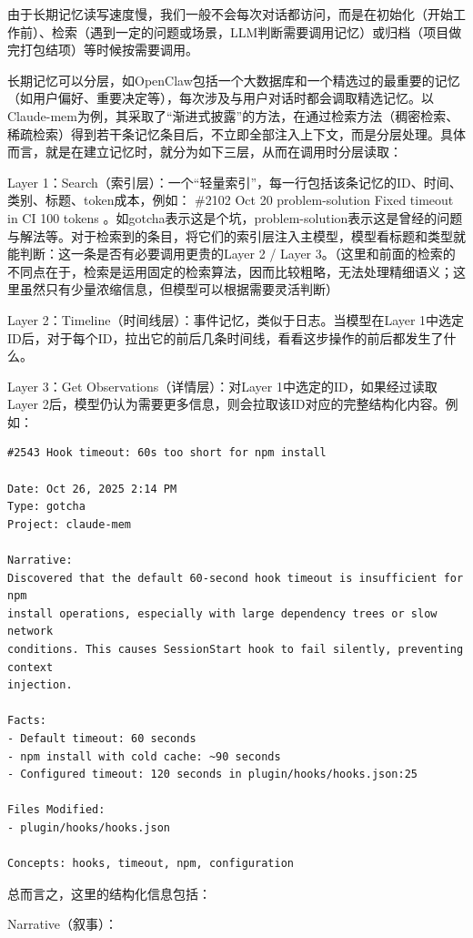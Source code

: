 由于长期记忆读写速度慢，我们一般不会每次对话都访问，而是在初始化（开始工作前）、检索（遇到一定的问题或场景，LLM判断需要调用记忆）或归档（项目做完打包结项）等时候按需要调用。

长期记忆可以分层，如OpenClaw包括一个大数据库和一个精选过的最重要的记忆（如用户偏好、重要决定等），每次涉及与用户对话时都会调取精选记忆。以Claude-mem为例，其采取了``渐进式披露''的方法，在通过检索方法（稠密检索、稀疏检索）得到若干条记忆条目后，不立即全部注入上下文，而是分层处理。具体而言，就是在建立记忆时，就分为如下三层，从而在调用时分层读取：

Layer 1：Search（索引层）：一个``轻量索引''，每一行包括该条记忆的ID、时间、类别、标题、token成本，例如：\textbar{} \#2102\textbar{} Oct 20 \textbar{} problem-solution \textbar{} Fixed timeout in CI \textbar{} 100 tokens \textbar。如gotcha表示这是个坑，problem-solution表示这是曾经的问题与解法等。对于检索到的条目，将它们的索引层注入主模型，模型看标题和类型就能判断：这一条是否有必要调用更贵的Layer 2 / Layer 3。（这里和前面的检索的不同点在于，检索是运用固定的检索算法，因而比较粗略，无法处理精细语义；这里虽然只有少量浓缩信息，但模型可以根据需要灵活判断）

Layer 2：Timeline（时间线层）：事件记忆，类似于日志。当模型在Layer 1中选定ID后，对于每个ID，拉出它的前后几条时间线，看看这步操作的前后都发生了什么。

Layer 3：Get Observations（详情层）：对Layer 1中选定的ID，如果经过读取Layer 2后，模型仍认为需要更多信息，则会拉取该ID对应的完整结构化内容。例如：

\begin{verbatim}
#2543 Hook timeout: 60s too short for npm install

Date: Oct 26, 2025 2:14 PM
Type: gotcha
Project: claude-mem

Narrative:
Discovered that the default 60-second hook timeout is insufficient for npm
install operations, especially with large dependency trees or slow network
conditions. This causes SessionStart hook to fail silently, preventing context
injection.

Facts:
- Default timeout: 60 seconds
- npm install with cold cache: ~90 seconds
- Configured timeout: 120 seconds in plugin/hooks/hooks.json:25

Files Modified:
- plugin/hooks/hooks.json

Concepts: hooks, timeout, npm, configuration
\end{verbatim}

总而言之，这里的结构化信息包括：

Narrative（叙事）：


